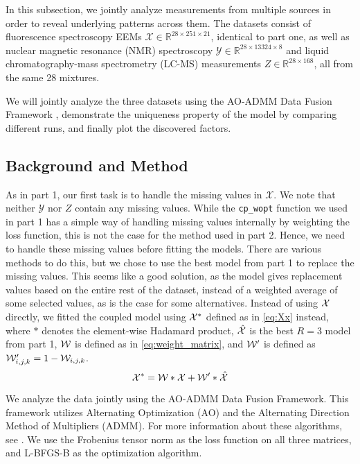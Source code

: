 In this subsection, we jointly analyze measurements from multiple sources in order to reveal underlying patterns across them.
The datasets consist of fluorescence spectroscopy EEMs $\mathcal{X} \in \mathbb{R}^{28 \times 251 \times 21}$, identical to part one, as well as nuclear magnetic resonance (NMR) spectroscopy $\mathcal{Y}\in \mathbb{R}^{28 \times 13324 \times 8}$ and liquid chromatography-mass spectrometry (LC-MS) measurements $Z \in \mathbb{R}^{28 \times 168}$, all from the same 28 mixtures.

We will jointly analyze the three datasets using the AO-ADMM Data Fusion Framework 
\cite{framework}, demonstrate the uniqueness property of the model by comparing different runs, and finally plot the discovered factors.


\subsection*{Background and Method}
As in part 1, our first task is to handle the missing values in $\mathcal{X}$.
We note that neither $\mathcal{Y}$ nor $Z$ contain any missing values.
While the \texttt{cp\_wopt} function we used in part 1 has a simple way of handling missing values internally by weighting the loss function, this is not the case for the method used in part 2.
Hence, we need to handle these missing values before fitting the models.
There are various methods to do this, but we chose to use the best model from part 1 to replace the missing values.
This seems like a good solution, as the model gives replacement values based on the entire rest of the dataset, instead of a weighted average of some selected values, as is the case for some alternatives.
Instead of using $\mathcal{X}$ directly, we fitted the coupled model using $\mathcal{X}^*$ defined as in \eqref{eq:Xx} instead, where $*$ denotes the element-wise Hadamard product, $\mathcal{\hat{X}}$ is the best $R=3$ model from part 1, $\mathcal{W}$ is defined as in \eqref{eq:weight_matrix}, and $\mathcal{W}'$ is defined as $\mathcal{W}'_{i,j,k} = 1 - \mathcal{W}_{i,j,k}$.
\begin{equation}
    \mathcal{X}^* = \mathcal{W}*\mathcal{X} + \mathcal{W}' *\mathcal{\hat{X}}
    \label{eq:Xx}
\end{equation}

We analyze the data jointly using the AO-ADMM Data Fusion Framework\cite{framework}.
This framework utilizes Alternating Optimization (AO) and the Alternating Direction Method of Multipliers (ADMM).
For more information about these algorithms, see \textcite{framework}.
We use the Frobenius tensor norm as the loss function on all three matrices, and L-BFGS-B as the optimization algorithm.



